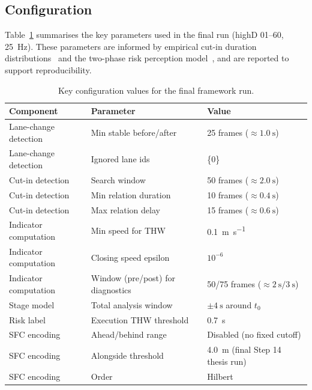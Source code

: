 \documentclass[12pt,a4paper,twoside,openright]{report}
\begin{document}
    \subsection{Configuration}
    Table~\ref{tab:config} summarises the key parameters used in the final run (highD 01--60, \SI{25}{\hertz}). These parameters are informed by empirical cut-in duration distributions~\cite{wang2019cutin} and the two-phase risk perception model~\cite{zhou2016riskperception}, and are reported to support reproducibility.

    \begin{table}[H]
        \centering
        \caption{Key configuration values for the final framework run.}
        \label{tab:config}
        {\small
        \setlength{\tabcolsep}{4pt}
            \begin{tabularx}{\textwidth}{@{}l l X@{}}
\toprule
Component & Parameter & Value \\
\midrule
Lane-change detection & Min stable before/after & 25 frames ($\approx \SI{1.0}{\second}$) \\
Lane-change detection & Ignored lane ids & \{0\} \\
Cut-in detection & Search window & 50 frames ($\approx \SI{2.0}{\second}$) \\
Cut-in detection & Min relation duration & 10 frames ($\approx \SI{0.4}{\second}$) \\
Cut-in detection & Max relation delay & 15 frames ($\approx \SI{0.6}{\second}$) \\
Indicator computation & Min speed for THW & \SI{0.1}{\meter\per\second} \\
Indicator computation & Closing speed epsilon & $10^{-6}$ \\
Indicator computation & Window (pre/post) for diagnostics & 50/75 frames ($\approx \SI{2}{\second}/\SI{3}{\second}$) \\
Stage model & Total analysis window & $\pm \SI{4}{\second}$ around $t_0$ \\
Risk label & Execution THW threshold & \SI{0.7}{\second} \\
SFC encoding & Ahead/behind range & Disabled (no fixed cutoff) \\
SFC encoding & Alongside threshold & \SI{4.0}{\meter} (final Step 14 thesis run) \\
SFC encoding & Order & Hilbert \\
\bottomrule
            \end{tabularx}}
    \end{table}
\end{document}
